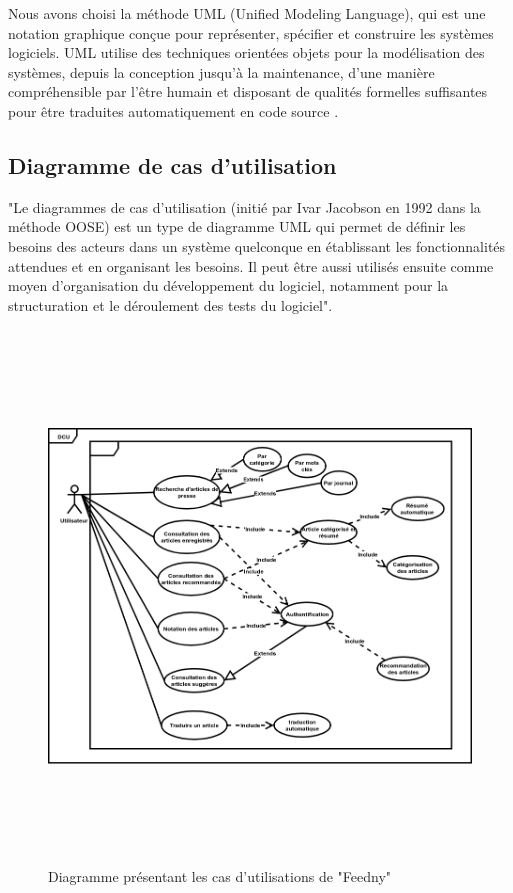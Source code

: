 Nous avons choisi la méthode UML (Unified Modeling Language), qui est une notation graphique conçue pour représenter, spécifier et construire les systèmes logiciels. UML utilise des techniques orientées objets pour la modélisation des systèmes, depuis la conception jusqu'à la maintenance, d'une manière compréhensible par l'être humain et disposant de qualités formelles suffisantes pour être traduites automatiquement en code source \cite{UML}.

\subsection{Diagramme de cas d'utilisation}
"Le diagrammes de cas d'utilisation (initié par Ivar Jacobson en 1992 dans la méthode OOSE) est un type de diagramme UML qui permet de définir les besoins des acteurs dans un système quelconque en établissant les fonctionnalités attendues et en organisant les besoins. Il peut être aussi utilisés ensuite comme moyen d'organisation du développement du logiciel, notamment pour la structuration et le déroulement des tests du logiciel".\cite{UML}
\begin{figure}[H]
    \centering
    \includegraphics[height=400pt,width=350pt]{img/chapter3/diagcasdutilisation.png}
    \caption{Diagramme présentant les cas d'utilisations de "Feedny"}
\end{figure}

